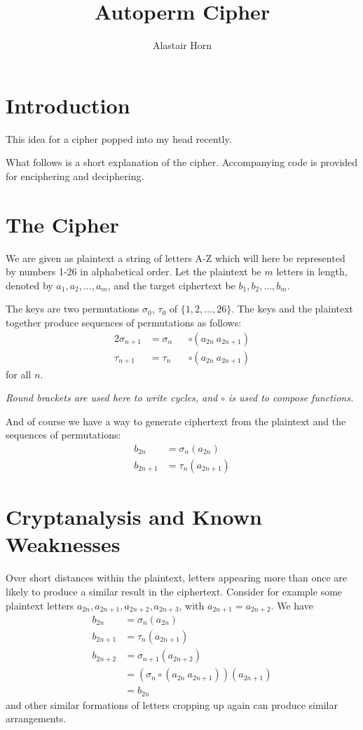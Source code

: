 \documentclass{article}
\title{Autoperm Cipher}
\author{Alastair Horn}
\begin{document}
\maketitle

\section*{Introduction}

This idea for a cipher popped into my head recently.

What follows is a short explanation of the cipher. Accompanying code is provided
for enciphering and deciphering.

\section*{The Cipher}

We are given as plaintext a string of letters A-Z which will here be represented
by numbers 1-26 in alphabetical order. Let the plaintext be \(m\) letters in
length, denoted by \(a_1, a_2, \dotsc, a_m\), and the target ciphertext be
\(b_1, b_2, \dotsc, b_m\).

The keys are two permutations \(\sigma_0\), \(\tau_0\) of
\(\{1, 2, \dotsc, 26\}\). The keys and the plaintext together produce sequences
of permutations as follows:
\begin{alignat*}2
 \sigma_{n + 1} &= \sigma_n && \circ (a_{2n}\ a_{2n + 1}) \\
 \tau_{n + 1}   &= \tau_n   && \circ (a_{2n}\ a_{2n + 1})
\end{alignat*}
for all \(n\).

\emph{Round brackets are used here to write cycles, and \(\circ\) is used to
compose functions.}

And of course we have a way to generate ciphertext from the plaintext and the
sequences of permutations:
\begin{align*}
  b_{2n}     &= \sigma_n(a_{2n}) \\
  b_{2n + 1} &= \tau_n (a_{2n + 1})
\end{align*}

\section*{Cryptanalysis and Known Weaknesses}

Over short distances within the plaintext, letters appearing more than once are
likely to produce a similar result in the ciphertext. Consider for example some
plaintext letters $a_{2n}, a_{2n + 1}, a_{2n + 2}, a_{2n + 3}$, with
$a_{2n + 1} = a_{2n + 2}$. We have
\begin{align*}
  b_{2n}   &= \sigma_n(a_{2n}) \\
  b_{2n+1} &= \tau_n(a_{2n + 1}) \\
  b_{2n+2} &= \sigma_{n+1}(a_{2n + 2})  \\
           &= (\sigma_n \circ (a_{2n}\ a_{2n + 1}))(a_{2n + 1}) \\
           &= b_{2n}
\end{align*}
and other similar formations of letters cropping up again can produce similar
arrangements.
\end{document}
